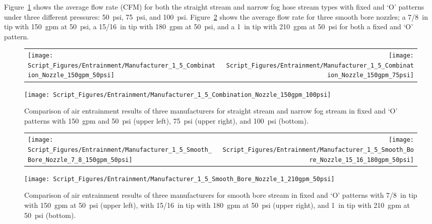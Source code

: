 \documentclass[12pt,oneside]{book}
\begin{document}
Figure~\ref{fig:1_5_Interior_Combination_Manufacturer} shows the average flow rate (CFM) for both the straight stream and narrow fog hose stream types with fixed and `O' patterns under three different pressures: 50~psi, 75~psi, and 100~psi. Figure~\ref{fig:1_5_Interior_Smooth_Bore_Manufacturer} shows the average flow rate for three smooth bore nozzles; a 7/8~in tip with 150~gpm at 50~psi, a 15/16~in tip with 180~gpm at 50~psi, and a 1~in tip with 210~gpm at 50~psi for both a fixed and `O' pattern.

\begin{figure}[!ht]
\begin{tabular*}{\textwidth}{lr}
\texttt{[image: Script\_Figures/Entrainment/Manufacturer\_1\_5\_Combination\_Nozzle\_150gpm\_50psi]} &
\texttt{[image: Script\_Figures/Entrainment/Manufacturer\_1\_5\_Combination\_Nozzle\_150gpm\_75psi]} \\
\end{tabular*}
\centering
\texttt{[image: Script\_Figures/Entrainment/Manufacturer\_1\_5\_Combination\_Nozzle\_150gpm\_100psi]}
\caption[Average Air Entrainment Varying Manufacturer with Combination Nozzles]{Comparison of air entrainment results of three manufacturers for straight stream and narrow fog stream in fixed and `O' patterns with 150~gpm and 50~psi (upper left), 75~psi (upper right), and 100~psi (bottom).}
\label{fig:1_5_Interior_Combination_Manufacturer}
\end{figure}

\begin{figure}[!ht]
\begin{tabular*}{\textwidth}{lr}
\texttt{[image: Script\_Figures/Entrainment/Manufacturer\_1\_5\_Smooth\_Bore\_Nozzle\_7\_8\_150gpm\_50psi]} &
\texttt{[image: Script\_Figures/Entrainment/Manufacturer\_1\_5\_Smooth\_Bore\_Nozzle\_15\_16\_180gpm\_50psi]} \\
\end{tabular*}
\centering
\texttt{[image: Script\_Figures/Entrainment/Manufacturer\_1\_5\_Smooth\_Bore\_Nozzle\_1\_210gpm\_50psi]} 
\caption[Average Air Entrainment Varying Manufacturer with Smooth Bore Nozzles]{Comparison of air entrainment results of three manufacturers for smooth bore stream in fixed and `O' patterns with 7/8~in tip with 150~gpm at 50~psi (upper left), with 15/16~in tip with 180~gpm at 50~psi (upper right), and 1~in tip with 210~gpm at 50~psi (bottom).}
\label{fig:1_5_Interior_Smooth_Bore_Manufacturer}
\end{figure}
\end{document}
